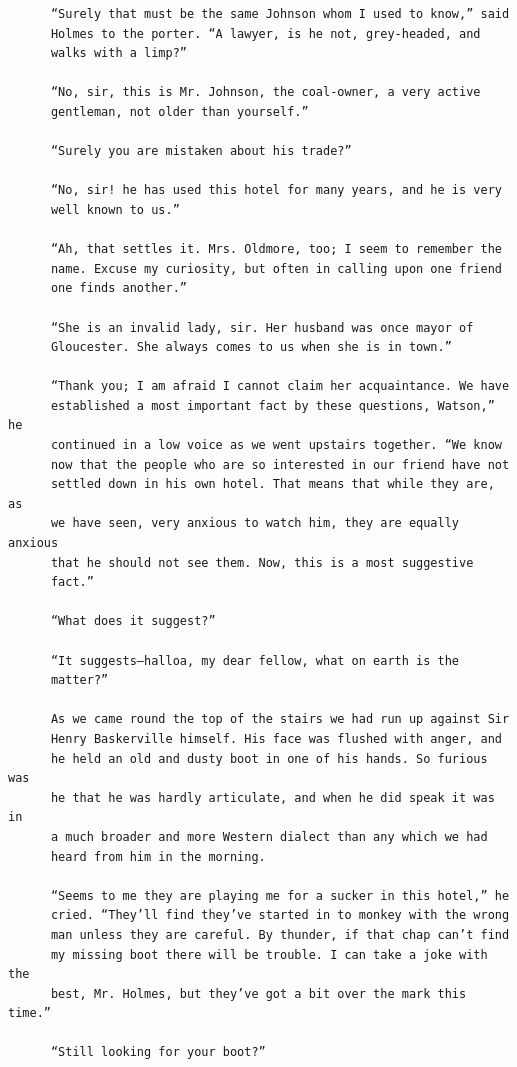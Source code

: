 \documentclass{article}
\begin{document}
\begin{verbatim}
      “Surely that must be the same Johnson whom I used to know,” said
      Holmes to the porter. “A lawyer, is he not, grey-headed, and
      walks with a limp?”

      “No, sir, this is Mr. Johnson, the coal-owner, a very active
      gentleman, not older than yourself.”

      “Surely you are mistaken about his trade?”

      “No, sir! he has used this hotel for many years, and he is very
      well known to us.”

      “Ah, that settles it. Mrs. Oldmore, too; I seem to remember the
      name. Excuse my curiosity, but often in calling upon one friend
      one finds another.”

      “She is an invalid lady, sir. Her husband was once mayor of
      Gloucester. She always comes to us when she is in town.”

      “Thank you; I am afraid I cannot claim her acquaintance. We have
      established a most important fact by these questions, Watson,” he
      continued in a low voice as we went upstairs together. “We know
      now that the people who are so interested in our friend have not
      settled down in his own hotel. That means that while they are, as
      we have seen, very anxious to watch him, they are equally anxious
      that he should not see them. Now, this is a most suggestive
      fact.”

      “What does it suggest?”

      “It suggests—halloa, my dear fellow, what on earth is the
      matter?”

      As we came round the top of the stairs we had run up against Sir
      Henry Baskerville himself. His face was flushed with anger, and
      he held an old and dusty boot in one of his hands. So furious was
      he that he was hardly articulate, and when he did speak it was in
      a much broader and more Western dialect than any which we had
      heard from him in the morning.

      “Seems to me they are playing me for a sucker in this hotel,” he
      cried. “They’ll find they’ve started in to monkey with the wrong
      man unless they are careful. By thunder, if that chap can’t find
      my missing boot there will be trouble. I can take a joke with the
      best, Mr. Holmes, but they’ve got a bit over the mark this time.”

      “Still looking for your boot?”


\end{verbatim}
\end{document}
